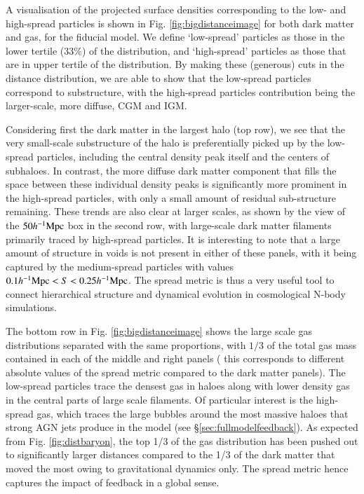 A visualisation of the projected surface densities corresponding to the low-
and high-spread particles is shown in Fig. \ref{fig:bigdistanceimage} for
both dark matter and gas, for the fiducial \simba{} model. We define
`low-spread' particles as those in the lower tertile (33\%) of the
distribution, and `high-spread' particles as those that are in upper
tertile of the distribution. By making these (generous) cuts in the distance
distribution, we are able to show that the low-spread particles correspond to
substructure, with the high-spread particles contribution being the
larger-scale, more diffuse, CGM and IGM.

Considering first the dark matter in the largest halo (top row), we see that
the very small-scale substructure of the halo is preferentially picked up by
the low-spread particles, including the central density peak itself and the
centers of subhaloes. In contrast, the more diffuse dark matter component that
fills the space between these individual density peaks is significantly more
prominent in the high-spread particles, with only a small amount of residual
sub-structure remaining. These trends are also clear at larger scales, as
shown by the view of the $50h^{-1}{\rm Mpc}{}$ box in the second row, with large-scale
dark matter filaments primarily traced by high-spread particles. It is
interesting to note that a large amount of structure in voids is not present
in either of these panels, with it being captured by the medium-spread
particles with values $0.1h^{-1}{\rm Mpc}{} < S < 0.25 h^{-1}{\rm Mpc}{}$. The spread
metric is thus a very useful tool to connect hierarchical structure and
dynamical evolution in cosmological N-body simulations.

The bottom row in Fig. \ref{fig:bigdistanceimage} shows the large scale gas
distributions separated with the same proportions, with $1/3$ of the total
gas mass contained in each of the middle and right panels ( this corresponds
to different absolute values of the spread metric compared to the dark matter
panels). The low-spread particles trace the densest gas in haloes along with
lower density gas in the central parts of large scale filaments. Of
particular interest is the high-spread gas, which traces the large bubbles
around the most massive haloes that strong AGN jets produce in the \simba{}
model (see \S \ref{sec:fullmodelfeedback}). As expected from Fig.
\ref{fig:distbaryon}, the top 1/3 of the gas distribution has been pushed out
to significantly larger distances compared to the 1/3 of the dark matter that
moved the most owing to gravitational dynamics only. The spread metric hence 
captures the impact of feedback in a global sense.

